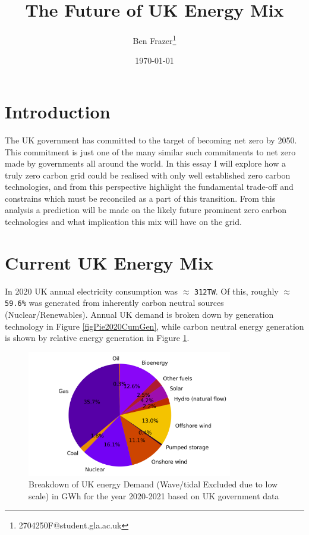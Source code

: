 \documentclass[11pt]{article}
\author{Ben Frazer\thanks{2704250F@student.gla.ac.uk}}
\date{\today}
\title{The Future of UK Energy Mix}
\numberwithin{equation}{section}
\begin{document}
\maketitle
\tableofcontents

\section{Introduction}
\label{sec:orgc8b7f0b}
The UK government has committed to the target of becoming net zero by 2050. This commitment is just one of the many similar such commitments to net zero made by governments all around the world. In this essay I will explore how a truly zero carbon grid could be realised with only well established zero carbon technologies, and from this perspective highlight the fundamental trade-off and constrains which must be reconciled as a part of this transition. From this analysis a prediction will be made on the likely future prominent zero carbon technologies and what implication this mix will have on the grid.
\section{Current UK Energy Mix \label{secCurrentUkEnergyMix}}
\label{sec:orgbacd2ed}
In 2020 UK annual electricity consumption was \(\approx\) \texttt{312TW}. Of this, roughly \(\approx\) \texttt{59.6\%} was generated from inherently carbon neutral sources (Nuclear/Renewables). Annual UK demand is broken down by generation technology in Figure \ref{figPie2020CumGen}, while carbon neutral energy generation is shown by relative energy generation in Figure \ref{figPie2020CumGen_all}.

\begin{figure}[H]
\centering
\includegraphics[width=0.8\textwidth]{./.ob-jupyter/a8d619243484ad885b707a27c333bdd574c2624c.png}
\caption{\label{figPie2020CumGen_all}Breakdown of UK energy Demand (Wave/tidal Excluded due to low scale) in GWh for the year 2020-2021 based on UK government data \cite{RenewableElecricityCap}}
\end{figure}
\end{document}
